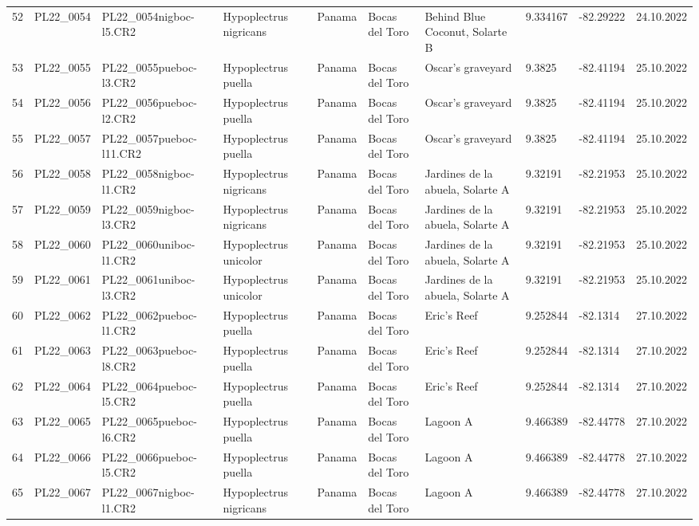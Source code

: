 \begin{table}[ht]
\begin{tabular}{rlllllllll}
  52 & PL22\_0054 & PL22\_0054nigboc-l5.CR2 & Hypoplectrus nigricans  & Panama & Bocas del Toro & Behind Blue Coconut, Solarte B & 9.334167 & -82.29222 & 24.10.2022 \\ 
  53 & PL22\_0055 & PL22\_0055pueboc-l3.CR2 & Hypoplectrus puella & Panama & Bocas del Toro & Oscar's graveyard & 9.3825 & -82.41194 & 25.10.2022 \\ 
  54 & PL22\_0056 & PL22\_0056pueboc-l2.CR2 & Hypoplectrus puella & Panama & Bocas del Toro & Oscar's graveyard & 9.3825 & -82.41194 & 25.10.2022 \\ 
  55 & PL22\_0057 & PL22\_0057pueboc-l11.CR2 & Hypoplectrus puella & Panama & Bocas del Toro & Oscar's graveyard & 9.3825 & -82.41194 & 25.10.2022 \\ 
  56 & PL22\_0058 & PL22\_0058nigboc-l1.CR2 & Hypoplectrus nigricans  & Panama & Bocas del Toro & Jardines de la abuela, Solarte A & 9.32191 & -82.21953 & 25.10.2022 \\ 
  57 & PL22\_0059 & PL22\_0059nigboc-l3.CR2 & Hypoplectrus nigricans  & Panama & Bocas del Toro & Jardines de la abuela, Solarte A & 9.32191 & -82.21953 & 25.10.2022 \\ 
  58 & PL22\_0060 & PL22\_0060uniboc-l1.CR2 & Hypoplectrus unicolor & Panama & Bocas del Toro & Jardines de la abuela, Solarte A & 9.32191 & -82.21953 & 25.10.2022 \\ 
  59 & PL22\_0061 & PL22\_0061uniboc-l3.CR2 & Hypoplectrus unicolor & Panama & Bocas del Toro & Jardines de la abuela, Solarte A & 9.32191 & -82.21953 & 25.10.2022 \\ 
  60 & PL22\_0062 & PL22\_0062pueboc-l1.CR2 & Hypoplectrus puella & Panama & Bocas del Toro & Eric's Reef & 9.252844 & -82.1314 & 27.10.2022 \\ 
  61 & PL22\_0063 & PL22\_0063pueboc-l8.CR2 & Hypoplectrus puella & Panama & Bocas del Toro & Eric's Reef & 9.252844 & -82.1314 & 27.10.2022 \\ 
  62 & PL22\_0064 & PL22\_0064pueboc-l5.CR2 & Hypoplectrus puella & Panama & Bocas del Toro & Eric's Reef & 9.252844 & -82.1314 & 27.10.2022 \\ 
  63 & PL22\_0065 & PL22\_0065pueboc-l6.CR2 & Hypoplectrus puella & Panama & Bocas del Toro & Lagoon A & 9.466389 & -82.44778 & 27.10.2022 \\ 
  64 & PL22\_0066 & PL22\_0066pueboc-l5.CR2 & Hypoplectrus puella & Panama & Bocas del Toro & Lagoon A & 9.466389 & -82.44778 & 27.10.2022 \\ 
  65 & PL22\_0067 & PL22\_0067nigboc-l1.CR2 & Hypoplectrus nigricans  & Panama & Bocas del Toro & Lagoon A & 9.466389 & -82.44778 & 27.10.2022 \\ 

\end{tabular}
\end{table}
